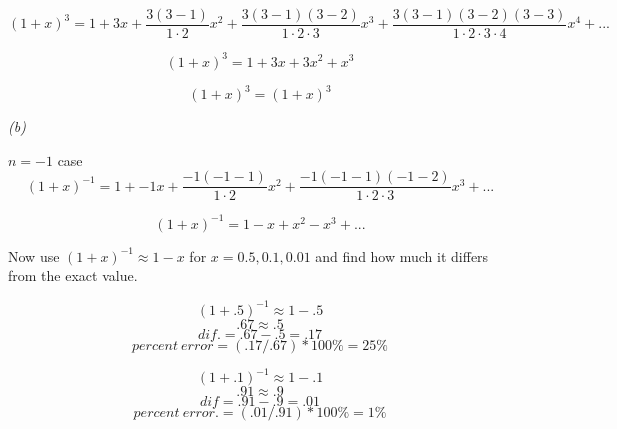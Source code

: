 \documentclass[a4paper, 12pt]{article}
\numberwithin{equation}{section}
\begin{document}
\begin{equation}
    ( 1 + x)^3 = 1 + 3x + \frac{3( 3 - 1  )} {1 \cdot{ 2}} x^2 + \frac{3( 3 - 1  ) ( 3 - 2)} {1 \cdot{2} \cdot{3}} x^3 +  \frac{3(3-1)(3-2)(3-3)} {1\cdot{2}\cdot{3}\cdot{4}} x^4
    + ...
\end{equation}

\begin{equation}
    ( 1 + x)^3 = 1 + 3x + 3 x^2 + x^3
\end{equation}

\begin{equation}
    \boxed{( 1 + x)^3 = ( 1 + x)^3}
\end{equation}

\emph{(b)}

$n=-1$
case
\begin{equation}
  ( 1 + x)^{-1} = 1 + -1x + \frac{-1( -1 - 1  )} {1 \cdot{ 2}} x^2 + \frac{-1( -1 - 1  ) ( -1 - 2)} {1 \cdot{2} \cdot{3}} x^3 + ...
\end{equation}

\begin{equation}
  \boxed{( 1 + x)^{-1} = 1 - x + x^2 - x^3 + ...}
\end{equation}

Now use
$( 1 + x)^{-1} \approx{1 - x}$
for
$x =0.5, 0.1, 0.01$
and find how much it differs from the exact value.

\begin{equation}
( 1 + .5)^{-1} \approx{1 - .5}
\end{equation}
\begin{equation}
.67 \approx{.5}
\end{equation}
\begin{equation}
dif. = .67 - .5 = .17
\end{equation}
\begin{equation}
\boxed { percent\:error = (.17 / .67) * 100\% = 25\% }
\end{equation}

\begin{equation}
( 1 + .1)^{-1} \approx{1 - .1}
\end{equation}
\begin{equation}
.91 \approx{.9}
\end{equation}
\begin{equation}
dif = .91 - .9 = .01
\end{equation}
\begin{equation}
\boxed { percent\:error. = (.01 / .91) * 100\% = 1\% }
\end{equation}
\end{document}
